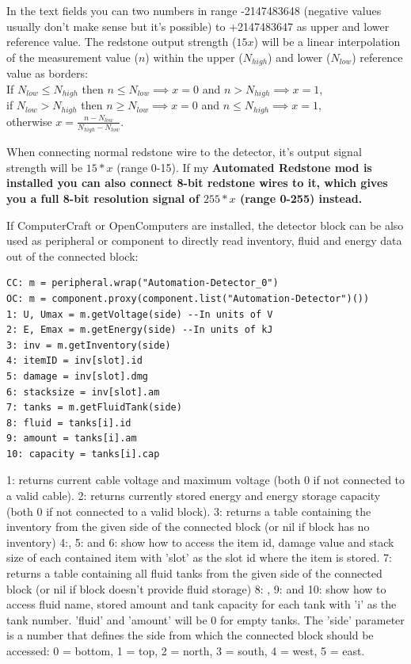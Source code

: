 \documentclass[11pt]{article} %
\begin{document}
In the text fields you can two numbers in range -2147483648 (negative values usually don't make sense but it's possible) to +2147483647 as upper and lower reference value. The redstone output strength ($15x$) will be a linear interpolation of the measurement value ($n$) within the upper ($N_{high}$) and lower ($N_{low}$) reference value as borders: \\
If $N_{low}\leq N_{high}$ then $n\leq N_{low}\implies x = 0$ and $n>N_{high}\implies x = 1$, \\
if $N_{low}>N_{high}$ then $n\geq N_{low}\implies x = 0$ and $n\leq N_{high}\implies x = 1$, \\
otherwise $x=\frac{n-N_{low}}{N_{high}-N_{low}}$.

When connecting normal redstone wire to the detector, it's output signal strength will be $15*x$ (range 0-15). If my \bf Automated Redstone \rm mod is installed you can also connect 8-bit redstone wires to it, which gives you a full 8-bit resolution signal of $255*x$ (range 0-255) instead.

If ComputerCraft or OpenComputers are installed, the detector block can be also used as peripheral or component to directly read inventory, fluid and energy data out of the connected block:
\begin{lstlisting}
CC: m = peripheral.wrap("Automation-Detector_0")
OC: m = component.proxy(component.list("Automation-Detector")())
1: U, Umax = m.getVoltage(side) --In units of V
2: E, Emax = m.getEnergy(side) --In units of kJ
3: inv = m.getInventory(side)
4: itemID = inv[slot].id
5: damage = inv[slot].dmg
6: stacksize = inv[slot].am
7: tanks = m.getFluidTank(side)
8: fluid = tanks[i].id
9: amount = tanks[i].am
10: capacity = tanks[i].cap
\end{lstlisting}
1: returns current cable voltage and maximum voltage (both 0 if not connected to a valid cable). 2: returns currently stored energy and energy storage capacity (both 0 if not connected to a valid block). 3: returns a table containing the inventory from the given side of the connected block (or nil if block has no inventory) 4:, 5: and 6: show how to access the item id, damage value and stack size of each contained item with 'slot' as the slot id where the item is stored. 7: returns a table containing all fluid tanks from the given side of the connected block (or nil if block doesn't provide fluid storage) 8: , 9: and 10: show how to access fluid name, stored amount and tank capacity for each tank with 'i' as the tank number. 'fluid' and 'amount' will be 0 for empty tanks. The 'side' parameter is a number that defines the side from which the connected block should be accessed: 0 = bottom, 1 = top, 2 = north, 3 = south, 4 = west, 5 = east.\\
\end{document}

